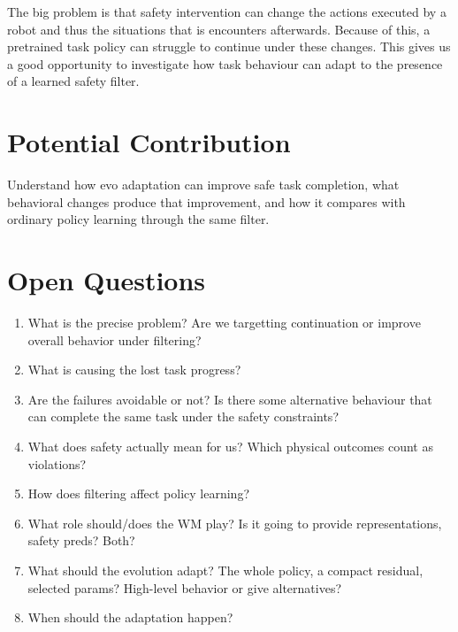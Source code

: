 The big problem is that safety intervention can change the actions executed by a robot and thus the situations that is encounters afterwards. Because of this, a pretrained task policy can struggle to continue under these changes. This gives us a good opportunity to investigate how task behaviour can adapt to the presence of a learned safety filter.

\section*{Potential Contribution}

Understand how evo adaptation can improve safe task completion, what behavioral changes produce that improvement, and how it compares with ordinary policy learning through the same filter.

\section*{Open Questions}

\begin{enumerate}[itemsep=0.5\baselineskip]
  \item What is the precise problem? Are we targetting continuation or improve overall behavior under filtering?
  \item What is causing the lost task progress?
  \item Are the failures avoidable or not? Is there some alternative behaviour that can complete the same task under the safety constraints?
  \item What does safety actually mean for us? Which physical outcomes count as violations?
  \item How does filtering affect policy learning?
  \item What role should/does the WM play? Is it going to provide representations, safety preds? Both?
  \item What should the evolution adapt? The whole policy, a compact residual, selected params? High-level behavior or give alternatives?
  \item When should the adaptation happen?
\end{enumerate}
